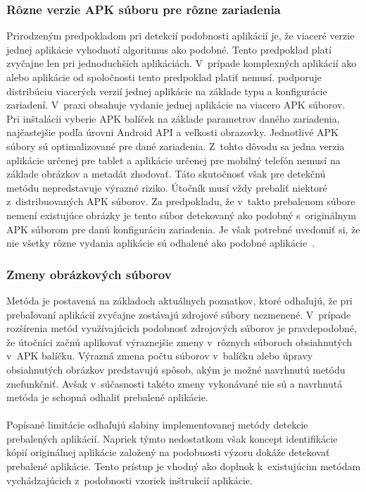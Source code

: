 \subsubsection{\textbf{Rôzne verzie APK súboru pre rôzne zariadenia}}
Prirodzeným predpokladom pri detekcií podobnosti aplikácií je, že viaceré verzie jednej aplikácie vyhodnotí algoritmus ako podobné. Tento predpoklad platí zvyčajne len pri jednoduchších aplikáciách. V~prípade komplexných aplikácií ako  alebo  aplikácie od spoločnosti  tento predpoklad platiť nemusí.  podporuje distribúciu viacerých verzií jednej aplikácie na základe typu a konfigurácie zariadení. V~praxi obsahuje vydanie jednej aplikácie na  viacero APK súborov. Pri inštalácii vyberie  APK balíček na základe parametrov daného zariadenia, najčastejšie podľa úrovni Android API a veľkosti obrazovky. Jednotlivé APK súbory sú optimalizované pre dané zariadenia. Z~tohto dôvodu sa jedna verzia aplikácie určenej pre tablet a aplikácie určenej pre mobilný telefón nemusí na základe obrázkov a metadát zhodovať. 
Táto skutočnosť však pre detekčnú metódu nepredstavuje výrazné riziko. Útočník musí vždy prebaliť niektoré z~distribuovaných APK súborov. Za predpokladu, že v~takto prebalenom súbore nemení existujúce obrázky je tento súbor detekovaný ako podobný s~originálnym APK súborom pre danú konfiguráciu zariadenia. Je však potrebné uvedomiť si, že nie všetky rôzne vydania aplikácie sú odhalené ako podobné aplikácie~\cite{MultipleApks}.

\subsubsection{\textbf{Zmeny obrázkových súborov}}
Metóda je postavená na základoch aktuálnych poznatkov, ktoré odhaľujú, že pri prebaľovaní aplikácií zvyčajne zostávajú zdrojové súbory nezmenené. V~prípade rozšírenia metód využívajúcich podobnosť zdrojových súborov je pravdepodobné, že útočníci začnú aplikovať výraznejšie zmeny v~rôznych súboroch obsiahnutých v~APK balíčku. Výrazná zmena počtu súborov v~balíčku alebo úpravy obsiahnutých obrázkov predstavujú spôsob, akým je možné navrhnutú metódu znefunkčniť. Avšak v~súčasnosti takéto zmeny vykonávané nie sú a navrhnutá metóda je schopná odhaliť prebalené aplikácie.
\\
\\
Popísané limitácie odhaľujú slabiny implementovanej metódy detekcie prebalených aplikácií. Napriek týmto nedostatkom však koncept identifikácie kópií originálnej aplikácie založený na podobnosti výzoru dokáže detekovať prebalené aplikácie. Tento prístup je vhodný ako doplnok k~existujúcim metódam vychádzajúcich z~podobnosti vzoriek inštrukcií aplikácie.


